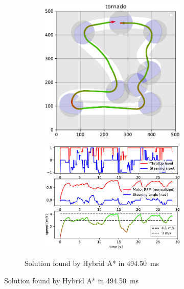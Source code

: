 \begin{figure}[!tbp]%
	\centering
	
	\begin{subfigure}[t]{\textwidth}
		\begin{subfigure}[c]{0.49\textwidth}
			\includegraphics[width=\textwidth]{../img/experiments/tornado_hybrid_astar_trajectory}
		\end{subfigure}
		\hfill
		\begin{subfigure}[c]{0.49\textwidth}
			\includegraphics[width=\textwidth]{../img/experiments/tornado_hybrid_astar_actuators}
		\end{subfigure}
		\caption{Solution found by Hybrid A* in \SI{494.50}{\milli\second}}
		\label{fig:solution_tornado-hybrid_astar}	
	\end{subfigure}
	

\end{figure}
